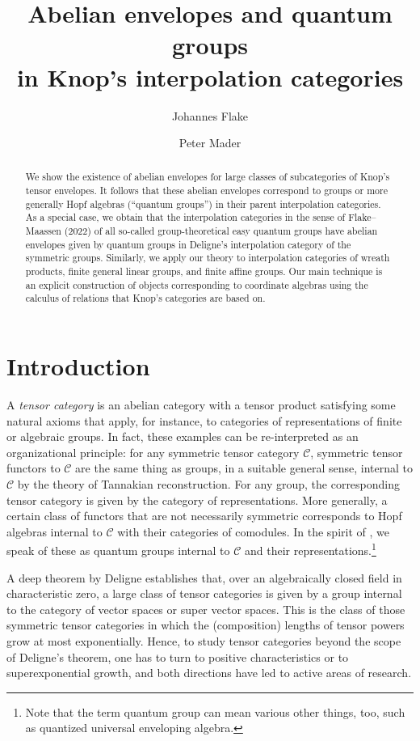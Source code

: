 \documentclass[11pt]{amsart}
\title[Abelian envelopes and quantum groups in Knop's interpolation categories]{Abelian envelopes and quantum groups\\in Knop's interpolation categories}
\author{Johannes Flake}
\author{Peter Mader}
\date{}
\theoremstyle{definition}
\theoremstyle{remark}
\newcommand\cC{\mathcal C}
\renewcommand\:\colon
\renewcommand\:\colon
\begin{document}
\begin{abstract} We show the existence of abelian envelopes for large classes of subcategories of Knop's tensor envelopes. It follows that these abelian envelopes correspond to groups or more generally Hopf algebras (``quantum groups'') in their parent interpolation categories. As a special case, we obtain that the interpolation categories in the sense of Flake--Maassen (2022) of all so-called group-theoretical easy quantum groups have abelian envelopes given by quantum groups in Deligne's interpolation category of the symmetric groups. Similarly, we apply our theory to interpolation categories of wreath products, finite general linear groups, and finite affine groups. Our main technique is an explicit construction of objects corresponding to coordinate algebras using the calculus of relations that Knop's categories are based on.
\end{abstract}

\maketitle

\section{Introduction}

A \emph{tensor category} is an abelian category with a tensor product satisfying some natural axioms that apply, for instance, to categories of representations of finite or algebraic groups. In fact, these examples can be re-interpreted as an organizational principle: for any symmetric tensor category $\cC$, symmetric tensor functors to $\cC$ are the same thing as groups, in a suitable general sense, internal to $\cC$ by the theory of Tannakian reconstruction. For any group, the corresponding tensor category is given by the category of representations. More generally, a certain class of functors that are not necessarily symmetric corresponds to Hopf algebras internal to $\cC$ with their categories of comodules. In the spirit of \cite{Drinfeld}, we speak of these as quantum groups internal to $\cC$ and their representations.\footnote{Note that the term quantum group can mean various other things, too, such as quantized universal enveloping algebra.}

A deep theorem by Deligne \cite{Del-tensorielles} establishes that, over an algebraically closed field in characteristic zero, a large class of tensor categories is given by a group internal to the category of vector spaces or super vector spaces. This is the class of those symmetric tensor categories in which the (composition) lengths of tensor powers grow at most exponentially. Hence, to study tensor categories beyond the scope of Deligne's theorem, one has to turn to positive characteristics or to superexponential growth, and both directions have led to active areas of research.
\end{document}
